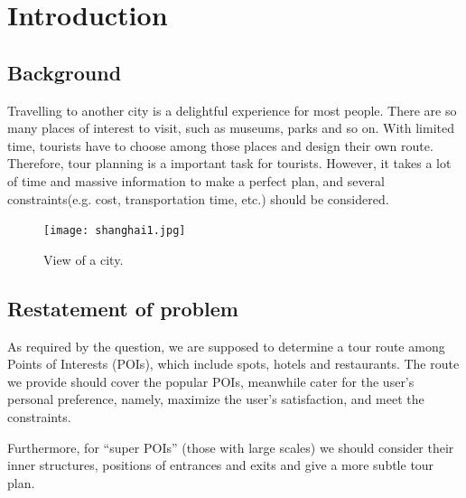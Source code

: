 \documentclass{mcmthesis}
\begin{document}
\newpage

\section{Introduction}	
\subsection{Background}
  Travelling to another city is a delightful experience for most people. There are so many places of interest to visit, such as museums, parks and so on. With limited time, tourists have to choose among those places and design their own route. Therefore, tour planning is a important task for tourists. However, it takes a lot of time and massive information to make a perfect plan, and several constraints(e.g. cost, transportation time, etc.) should be considered.
  \begin{figure}[h]
    \centering
    \texttt{[image: shanghai1.jpg]}
    \caption{View of a city.}
    \label{fig:city}
  \end{figure}
\subsection{Restatement of problem}
  As required by the question, we are supposed to determine a tour route among Points of Interests (POIs), which include spots, hotels and restaurants. The route we provide should cover the popular POIs, meanwhile cater for the user's personal preference, namely, maximize the user's satisfaction\cite{Cicerali2017Linking}, and meet the constraints. \par
  Furthermore, for ``super POIs'' (those with large scales) we should consider their inner structures, positions of entrances and exits and give a more subtle tour plan.
\end{document}
